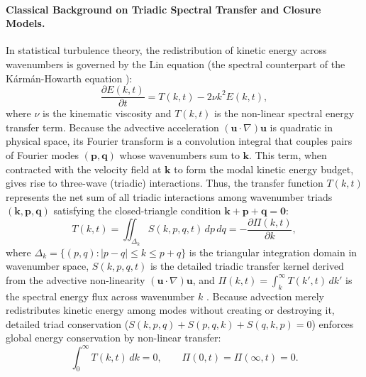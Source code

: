 \documentclass[lineno]{jfm}
\begin{document}
\paragraph{Classical Background on Triadic Spectral Transfer and Closure Models.}
In statistical turbulence theory, the redistribution of kinetic energy across wavenumbers is governed by the Lin equation (the spectral counterpart of the K\'arm\'an-Howarth equation \citep{vonKarmanHowarth1938, Lin1947}):
\begin{equation}
\frac{\partial E(k,t)}{\partial t} = T(k,t) - 2\nu k^2 E(k,t),
\label{eq:lin_equation}
\end{equation}
where $\nu$ is the kinematic viscosity and $T(k,t)$ is the non-linear spectral energy transfer term. Because the advective acceleration $(\mathbf{u}\cdot\nabla)\mathbf{u}$ is quadratic in physical space, its Fourier transform is a convolution integral that couples pairs of Fourier modes $(\mathbf{p}, \mathbf{q})$ whose wavenumbers sum to $\mathbf{k}$. This term, when contracted with the velocity field at $\mathbf{k}$ to form the modal kinetic energy budget, gives rise to three-wave (triadic) interactions. Thus, the transfer function $T(k,t)$ represents the net sum of all triadic interactions among wavenumber triads $(\mathbf{k}, \mathbf{p}, \mathbf{q})$ satisfying the closed-triangle condition $\mathbf{k} + \mathbf{p} + \mathbf{q} = \mathbf{0}$:
\begin{equation}
T(k,t) = \iint_{\Delta_k} S(k, p, q, t)\,dp\,dq = -\frac{\partial \Pi(k,t)}{\partial k},
\label{eq:triad_transfer}
\end{equation}
where $\Delta_k = \{(p,q) : |p-q| \le k \le p+q\}$ is the triangular integration domain in wavenumber space, $S(k,p,q,t)$ is the detailed triadic transfer kernel derived from the advective non-linearity $(\mathbf{u}\cdot\nabla)\mathbf{u}$, and $\Pi(k,t) = \int_k^\infty T(k',t)\,dk'$ is the spectral energy flux across wavenumber $k$ \citep{ProudmanReid1954}. Because advection merely redistributes kinetic energy among modes without creating or destroying it, detailed triad conservation ($S(k,p,q) + S(p,q,k) + S(q,k,p) = 0$) enforces global energy conservation by non-linear transfer:
\begin{equation}
\int_0^\infty T(k,t)\,dk = 0, \qquad \Pi(0,t) = \Pi(\infty,t) = 0.
\label{eq:transfer_conservation}
\end{equation}
\end{document}
